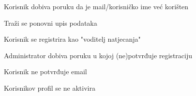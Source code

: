 \begin{packed_item}
\begin{packed_item}
\begin{packed_enum}
								\item Korisnik dobiva poruku da je mail/korisničko ime već korišten
								\item Traži se ponovni upis podataka
								
							\end{packed_enum}
							\item[2.f]Korisnik se registrira kao "voditelj natjecanja"
							\item[] \begin{packed_enum}
								
								\item Administrator dobiva poruku u kojoj (ne)potvrđuje registraciju

								
							\end{packed_enum}
							\item[4.a] Korisnik ne potvrđuje email
							\item[] \begin{packed_enum}
								
								\item Korisnikov profil se ne aktivira
								
							\end{packed_enum}

							
						\end{packed_item}
					\end{packed_item}
					\noindent {}
